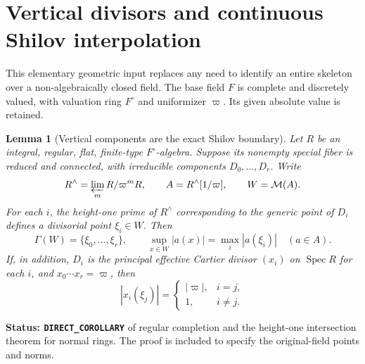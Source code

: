 \documentclass[11pt,a4paper]{article}
\numberwithin{equation}{section}
\newtheorem{lemma}[theorem]{Lemma}
\theoremstyle{definition}
\theoremstyle{remark}
\begin{document}


\section{Vertical divisors and continuous Shilov interpolation}
\label{sec:r5-vertical-shilov-interpolation}

This elementary geometric input replaces any need to identify an
entire skeleton over a non-algebraically closed field.  The base field
$F$ is complete and discretely valued, with valuation ring $F^\circ$
and uniformizer $\varpi$.  Its given absolute value is retained.

\begin{lemma}[Vertical components are the exact Shilov boundary]
\label{lem:r5-vertical-shilov-boundary}
Let $R$ be an integral, regular, flat, finite-type $F^\circ$-algebra.
Suppose its nonempty special fiber is reduced and connected, with
irreducible components $D_0,\ldots,D_r$.  Write
\[
 R^\wedge=\varprojlim_m R/\varpi^mR,\qquad
 A=R^\wedge[1/\varpi],\qquad W=\mathcal M(A).
\]
For each $i$, the height-one prime of $R^\wedge$ corresponding to
the generic point of $D_i$ defines a divisorial point $\xi_i\in W$.
Then
\begin{equation}
 \Gamma(W)=\{\xi_0,\ldots,\xi_r\},\qquad
 \sup_{x\in W}|a(x)|=\max_i|a(\xi_i)|\quad(a\in A).
 \label{eq:r5-vertical-shilov-norm}
\end{equation}
If, in addition, $D_i$ is the principal effective Cartier divisor
$(x_i)$ on $\operatorname{Spec}R$ for each $i$, and
$x_0\cdots x_r=\varpi$, then
\begin{equation}
 |x_i(\xi_j)|=
 \begin{cases}|\varpi|,&i=j,\\1,&i\ne j.\end{cases}
 \label{eq:r5-vertical-log-coordinate-values}
\end{equation}
\end{lemma}

\noindent\textbf{Status: \texttt{DIRECT\_COROLLARY}} of regular
completion and the height-one intersection theorem for normal rings.
The proof is included to specify the original-field points and norms.
\end{document}
